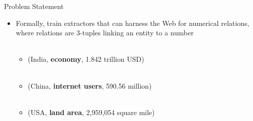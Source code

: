 \documentclass{beamer}
\begin{document}
\begin{frame}{Problem Statement}
\begin{itemize}
 \item Formally, train extractors that can harness the Web for numerical relations, where relations are 3-tuples linking an entity
to a number \\~\\
   
    \begin{itemize}
	\item  (India, \textbf{economy}, 1.842 trillion USD) \\~\\
	\item  (China, \textbf{internet users},  590.56 million) \\~\\
	\item  (USA, \textbf{land area}, 2,959,054 square mile)
    \end{itemize}

 \end{itemize}
\end{frame}

\end{document}
